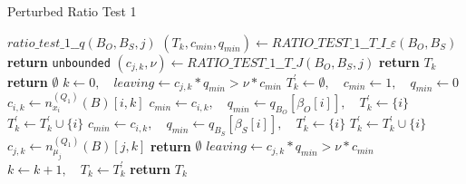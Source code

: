 \documentclass[a4paper]{article}
\begin{document}
\begin{algorithm}
\caption{Perturbed Ratio Test 1}
\label{alg:ratio_test_step_1_pert}
\begin{algorithmic}
\State $ratio\_test\_1\_\_q(B_{O},B_{S},j)$
\State $(T_{k}, c_{min}, q_{min})
  \gets RATIO\_TEST\_1\_\_T\_I\_\varepsilon(B_{O},B_{S})$
    \State \textbf{return} \texttt{unbounded}
\EndIf
\State $(c_{j,k}, \nu)
  \gets RATIO\_TEST\_1\_\_T\_J(B_{O}, B_{S},j)$
  \State \textbf{return} $T_{k}$
  \State \textbf{return} $\emptyset$
\Else
  \State $k \gets 0, \quad leaving \gets c_{j,k}*q_{min} > \nu * c_{min}$
  \Repeat
    \State $T_{k}^{\prime} \gets \emptyset,
      \quad c_{min} \gets 1,
      \quad q_{min} \gets 0$
      \State $c_{i,k} \gets n_{x_{i}}^{(Q_{1})}(B)[i,k]$
       
	  \State $c_{min} \gets c_{i,k},
            \quad q_{min} \gets q_{B_{O}}[\beta_{O}[i]],
            \quad T_{k}^{\prime} \gets \{i\}$
	  \State $T_{k}^{\prime} \gets T_{k}^{\prime} \cup \{i\}$
	\EndIf
      \Else {}
	  \State $c_{min} \gets c_{i,k},
            \quad q_{min} \gets q_{B_{S}}[\beta_{S}[i]],
	    \quad T_{k}^{\prime} \gets \{i\}$
	  \State $T_{k}^{\prime} \gets T_{k}^{\prime} \cup \{i\}$
	\EndIf
      \EndIf
    \EndFor
      \State $c_{j,k} \gets n_{\mu_{j}}^{(Q_{1})}(B)[j,k]$
        \State \textbf{return} $\emptyset$
      \EndIf
      \State $leaving \gets c_{j,k} * q_{min} > \nu *c_{min}$
    \EndIf 
    \State $k \gets k+1, \quad T_{k} \gets T_{k}^{\prime}$
  \State \textbf{return} $T_{k}$
\EndIf    
\EndFunction
\end{algorithmic}
\end{algorithm}
\end{document}

